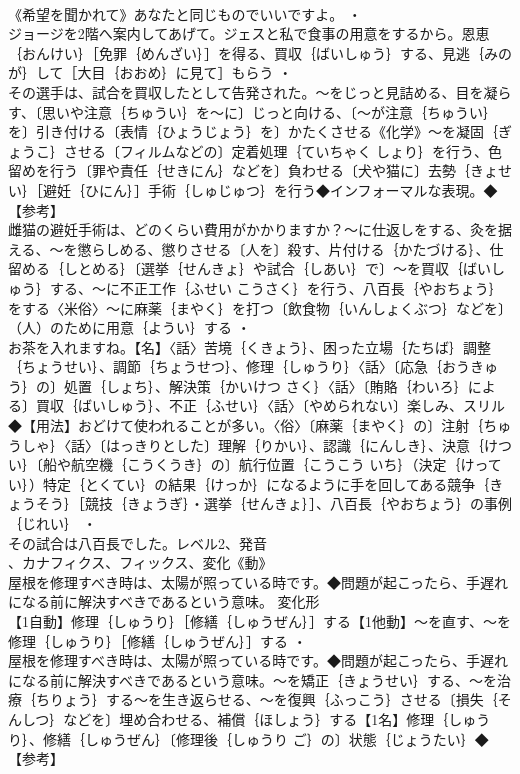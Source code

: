 \documentclass[8pt]{extreport}
\begin{document}
\begin{CJK}{UTF8}{min}
\\	《希望を聞かれて》あなたと同じものでいいですよ。 ・
\\	ジョージを2階へ案内してあげて。ジェスと私で食事の用意をするから。恩恵｛おんけい｝［免罪｛めんざい｝］を得る、買収｛ばいしゅう｝する、見逃｛みのが｝して［大目｛おおめ｝に見て］もらう ・
\\	その選手は、試合を買収したとして告発された。～をじっと見詰める、目を凝らす、〔思いや注意｛ちゅうい｝を～に〕じっと向ける、〔～が注意｛ちゅうい｝を〕引き付ける〔表情｛ひょうじょう｝を〕かたくさせる《化学》～を凝固｛ぎょうこ｝させる〔フィルムなどの〕定着処理｛ていちゃく しょり｝を行う、色留めを行う〔罪や責任｛せきにん｝などを〕負わせる〔犬や猫に〕去勢｛きょせい｝［避妊｛ひにん｝］手術｛しゅじゅつ｝を行う◆インフォーマルな表現。◆【参考】
\\	雌猫の避妊手術は、どのくらい費用がかかりますか？～に仕返しをする、灸を据える、～を懲らしめる、懲りさせる〔人を〕殺す、片付ける｛かたづける｝、仕留める｛しとめる｝〔選挙｛せんきょ｝や試合｛しあい｝で〕～を買収｛ばいしゅう｝する、～に不正工作｛ふせい こうさく｝を行う、八百長｛やおちょう｝をする〈米俗〉～に麻薬｛まやく｝を打つ〔飲食物｛いんしょくぶつ｝などを〕（人）のために用意｛ようい｝する ・
\\	お茶を入れますね。【名】〈話〉苦境｛くきょう｝、困った立場｛たちば｝調整｛ちょうせい｝、調節｛ちょうせつ｝、修理｛しゅうり｝〈話〉〔応急｛おうきゅう｝の〕処置｛しょち｝、解決策｛かいけつ さく｝〈話〉〔賄賂｛わいろ｝による〕買収｛ばいしゅう｝、不正｛ふせい｝〈話〉〔やめられない〕楽しみ、スリル◆【用法】おどけて使われることが多い。〈俗〉〔麻薬｛まやく｝の〕注射｛ちゅうしゃ｝〈話〉〔はっきりとした〕理解｛りかい｝、認識｛にんしき｝、決意｛けつい｝〔船や航空機｛こうくうき｝の〕航行位置｛こうこう いち｝（決定｛けってい｝）特定｛とくてい｝の結果｛けっか｝になるように手を回してある競争｛きょうそう｝［競技｛きょうぎ｝・選挙｛せんきょ｝］、八百長｛やおちょう｝の事例｛じれい｝ ・
\\	その試合は八百長でした。レベル2、発音
\\	、カナフィクス、フィックス、変化《動》
\\	屋根を修理すべき時は、太陽が照っている時です。◆問題が起こったら、手遅れになる前に解決すべきであるという意味。	変化形 
\\	【1自動】修理｛しゅうり｝［修繕｛しゅうぜん｝］する【1他動】～を直す、～を修理｛しゅうり｝［修繕｛しゅうぜん｝］する ・
\\	屋根を修理すべき時は、太陽が照っている時です。◆問題が起こったら、手遅れになる前に解決すべきであるという意味。～を矯正｛きょうせい｝する、～を治療｛ちりょう｝する～を生き返らせる、～を復興｛ふっこう｝させる〔損失｛そんしつ｝などを〕埋め合わせる、補償｛ほしょう｝する【1名】修理｛しゅうり｝、修繕｛しゅうぜん｝〔修理後｛しゅうり ご｝の〕状態｛じょうたい｝◆【参考】

\end{CJK}
\end{document}

